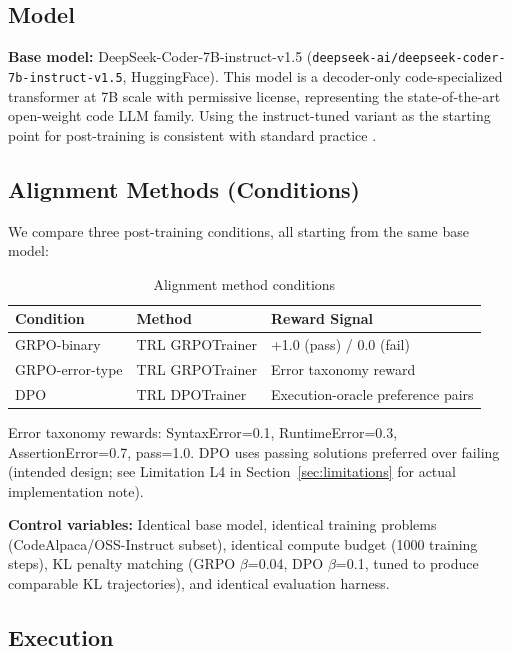 \subsection{Model}

\textbf{Base model:} DeepSeek-Coder-7B-instruct-v1.5 (\texttt{deepseek-ai/deepseek-coder-7b-instruct-v1.5},
HuggingFace). This model is a decoder-only code-specialized transformer at 7B
scale with permissive license, representing the state-of-the-art open-weight
code LLM family. Using the instruct-tuned variant as the starting point for
post-training is consistent with standard practice \cite{Lambert2024TULU}.

\subsection{Alignment Methods (Conditions)}

We compare three post-training conditions, all starting from the same base model:

\begin{table}[h]
\centering
\caption{Alignment method conditions}
\label{tab:conditions}
\begin{tabular}{lll}
\toprule
\textbf{Condition} & \textbf{Method} & \textbf{Reward Signal} \\
\midrule
GRPO-binary & TRL GRPOTrainer & +1.0 (pass) / 0.0 (fail) \\
GRPO-error-type & TRL GRPOTrainer & Error taxonomy reward \\
DPO & TRL DPOTrainer & Execution-oracle preference pairs \\
\bottomrule
\end{tabular}
\end{table}

Error taxonomy rewards: SyntaxError=0.1, RuntimeError=0.3, AssertionError=0.7, pass=1.0.
DPO uses passing solutions preferred over failing (intended design; see Limitation L4 in Section~\ref{sec:limitations} for actual implementation note).

\textbf{Control variables:} Identical base model, identical training problems
(CodeAlpaca/OSS-Instruct subset), identical compute budget (1000 training steps),
KL penalty matching (GRPO $\beta$=0.04, DPO $\beta$=0.1, tuned to produce
comparable KL trajectories), and identical evaluation harness.

\subsection{Execution}

